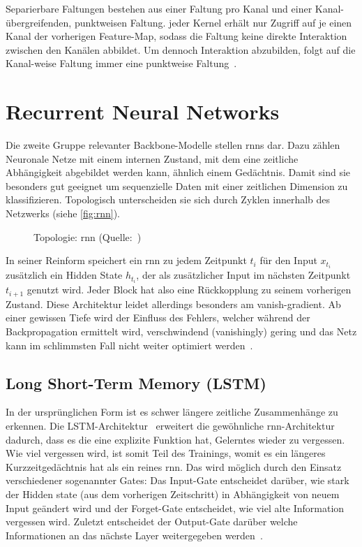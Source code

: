 Separierbare Faltungen bestehen aus einer Faltung pro Kanal und einer Kanal-übergreifenden, punktweisen Faltung.
\Dh jeder Kernel erhält nur Zugriff auf je einen Kanal der vorherigen Feature-Map, sodass die Faltung keine direkte Interaktion zwischen den Kanälen abbildet.
Um dennoch Interaktion abzubilden, folgt auf die Kanal-weise Faltung immer eine punktweise Faltung~\cite{Howard17}.

\section{Recurrent Neural Networks}
\label{subsec:recurrent-neural-networks}

Die zweite Gruppe relevanter Backbone-Modelle stellen \glspl{rnn} dar.
Dazu zählen Neuronale Netze mit einem internen Zustand, mit dem eine zeitliche Abhängigkeit abgebildet werden kann, ähnlich einem Gedächtnis.
Damit sind sie besonders gut geeignet um sequenzielle Daten mit einer zeitlichen Dimension zu klassifizieren.
Topologisch unterscheiden sie sich durch Zyklen innerhalb des Netzwerks (siehe \autoref{fig:rnn}).

\begin{figure}[h!]
    \centering
    \caption{Topologie: \gls{rnn} (Quelle:~\cite{Veen17})}
    \label{fig:rnn}
\end{figure}

In seiner Reinform speichert ein \gls{rnn} zu jedem Zeitpunkt $t_i$ für den Input $x_{t_i}$ zusätzlich ein Hidden State $h_{t_i}$, der als zusätzlicher Input im nächsten Zeitpunkt $t_{i+1}$ genutzt wird.
Jeder Block hat also eine Rückkopplung zu seinem vorherigen Zustand.
Diese Architektur leidet allerdings besonders am \gls{vanish-gradient}.
Ab einer gewissen Tiefe wird der Einfluss des Fehlers, welcher während der Backpropagation ermittelt wird, verschwindend (vanishingly) gering und das Netz kann im schlimmsten Fall nicht weiter optimiert werden~\cite{Pointer19}.

\subsection*{Long Short-Term Memory (LSTM)}

In der ursprünglichen Form ist es schwer längere zeitliche Zusammenhänge zu erkennen.
Die LSTM-Architektur~\cite{Hochreiter97} erweitert die gewöhnliche \gls{rnn}-Architektur dadurch, dass es die eine explizite Funktion hat, Gelerntes wieder zu vergessen.
Wie viel vergessen wird, ist somit Teil des Trainings, womit es ein längeres Kurzzeitgedächtnis hat als ein reines \gls{rnn}.
Das wird möglich durch den Einsatz verschiedener sogenannter Gates:
Das Input-Gate entscheidet darüber, wie stark der Hidden state (aus dem vorherigen Zeitschritt) in Abhängigkeit von neuem Input geändert wird und der Forget-Gate entscheidet, wie viel alte Information vergessen wird.
Zuletzt entscheidet der Output-Gate darüber welche Informationen an das nächste Layer weitergegeben werden~\cite{goodfellow16, Pointer19}.

